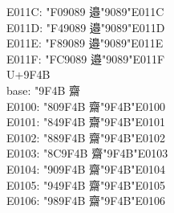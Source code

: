 \documentclass{ujarticle}
\begin{document}
\begin{multicols*}{4}
E011C: \kchar"F09089 邉󠄜\kchar"9089\kchar"E011C\\
E011D: \kchar"F49089 邉󠄝\kchar"9089\kchar"E011D\\
E011E: \kchar"F89089 邉󠄞\kchar"9089\kchar"E011E\\
E011F: \kchar"FC9089 邉󠄟\kchar"9089\kchar"E011F\\
\VS
U+9F4B\\
base: \kchar"9F4B 齋\\
E0100: \kchar"809F4B 齋󠄀\kchar"9F4B\kchar"E0100\\
E0101: \kchar"849F4B 齋󠄁\kchar"9F4B\kchar"E0101\\
E0102: \kchar"889F4B 齋󠄂\kchar"9F4B\kchar"E0102\\
E0103: \kchar"8C9F4B 齋󠄃\kchar"9F4B\kchar"E0103\\
E0104: \kchar"909F4B 齋󠄄\kchar"9F4B\kchar"E0104\\
E0105: \kchar"949F4B 齋󠄅\kchar"9F4B\kchar"E0105\\
E0106: \kchar"989F4B 齋󠄆\kchar"9F4B\kchar"E0106\\


\end{multicols*}
\end{document}
